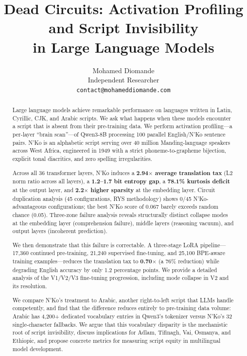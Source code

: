 \documentclass[11pt]{article}
\title{Dead Circuits: Activation Profiling and Script Invisibility\\in Large Language Models}
\author{
  Mohamed Diomande \\
  Independent Researcher \\
  \texttt{contact@mohameddiomande.com}
}
\begin{document}
\maketitle

\begin{abstract}
Large language models achieve remarkable performance on languages written in Latin, Cyrillic, CJK, and Arabic scripts.
We ask what happens when these models encounter a script that is absent from their pre-training data.
We perform activation profiling---a per-layer ``brain scan''---of Qwen3-8B processing 100 parallel English/N'Ko sentence pairs.
N'Ko is an alphabetic script serving over 40 million Manding-language speakers across West Africa, engineered in 1949 with a strict phoneme-to-grapheme bijection, explicit tonal diacritics, and zero spelling irregularities.

Across all 36 transformer layers, N'Ko induces a \textbf{2.94$\times$ average translation tax} (L2 norm ratio across all layers), a \textbf{1.2--1.7 bit entropy gap}, a \textbf{78.1\% kurtosis deficit} at the output layer, and \textbf{2.2$\times$ higher sparsity} at the embedding layer.
Circuit duplication analysis (45 configurations, RYS methodology) shows 0/45 N'Ko-advantageous configurations; the best N'Ko score of 0.067 barely exceeds random chance (0.05).
Three-zone failure analysis reveals structurally distinct collapse modes at the embedding layer (comprehension failure), middle layers (reasoning vacuum), and output layers (incoherent prediction).

We then demonstrate that this failure is correctable.
A three-stage LoRA pipeline---17,360 continued pre-training, 21,240 supervised fine-tuning, and 25,100 BPE-aware training examples---reduces the translation tax to \textbf{0.70$\times$} (a 76\% reduction) while degrading English accuracy by only 1.2 percentage points.
We provide a detailed analysis of the V1/V2/V3 fine-tuning progression, including mode collapse in V2 and its resolution.

We compare N'Ko's treatment to Arabic, another right-to-left script that LLMs handle competently, and find that the difference reduces entirely to pre-training data volume: Arabic has 4,200+ dedicated vocabulary entries in Qwen3's tokenizer versus N'Ko's 32 single-character fallbacks.
We argue that this vocabulary disparity is the mechanistic root of script invisibility, discuss implications for Adlam, Tifinagh, Vai, Osmanya, and Ethiopic, and propose concrete metrics for measuring script equity in multilingual model development.
\end{abstract}
\end{document}
